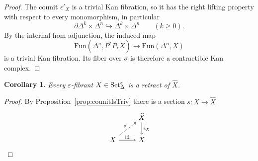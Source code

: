 \documentclass{article}
\theoremstyle{plain}
\newtheorem{corollary}[theorem]{Corollary}
\theoremstyle{definition}
\theoremstyle{remark}
\begin{document}
\begin{proof}
The counit $\epsilon'_X$ is a trivial Kan fibration,
so it has the right lifting property with respect to
every monomorphism, in particular
\[
    \partial\Delta^k\times\Delta^n
    \hookrightarrow
    \Delta^k\times\Delta^n
    \qquad(k\geq 0).
\]
By the internal-hom adjunction, the induced map
\[
    \mathrm{Fun}(\Delta^n,P^*P_*X)
    \longrightarrow
    \mathrm{Fun}(\Delta^n,X)
\]
is a trivial Kan fibration.
Its fiber over $\sigma$ is therefore a contractible
Kan complex.
\end{proof}
\begin{corollary}\label{cor:retract}
    Every $\varepsilon$-fibrant $X\in\mathrm{Set}^\varepsilon_\Delta$ is a retract of $\widehat{X}$.
\end{corollary}
\begin{proof}
    By Proposition~\ref{prop:counitIsTriv} there is a section $s\colon X\rightarrow \widehat{X}$
    \begin{equation*}
        \begin{tikzcd}
            & {\widehat{X}}\arrow[d,"\hat{\epsilon}_X"]\\
            X\arrow[ru,"s",dashed]\arrow[r,"{\mathrm{id}}"]&X
        \end{tikzcd}
    \end{equation*}
\end{proof}
\end{document}
